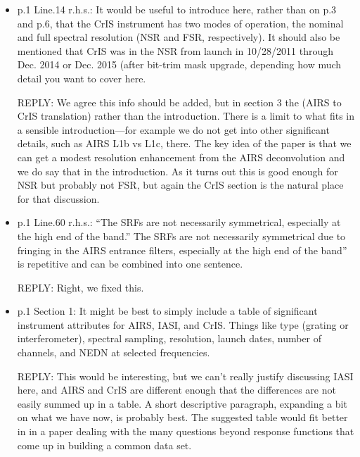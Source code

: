 \documentclass[11pt]{article}
\newcommand {\reply} {\mbox{\small REPLY}}
\begin{document}
\begin{itemize}

\item p.1 Line.14 r.h.s.: It would be useful to introduce here,
  rather than on p.3 and p.6, that the CrIS instrument has two modes
  of operation, the nominal and full spectral resolution (NSR and
  FSR, respectively).  It should also be mentioned that CrIS was in
  the NSR from launch in 10/28/2011 through Dec. 2014 or Dec. 2015
  (after bit-trim mask upgrade, depending how much detail you want
  to cover here.

  \reply: We agree this info should be added, but in section 3 the
  (AIRS to CrIS translation) rather than the introduction.  There is
  a limit to what fits in a sensible introduction---for example we
  do not get into other significant details, such as AIRS L1b vs
  L1c, there.  The key idea of the paper is that we can get a modest
  resolution enhancement from the AIRS deconvolution and we do say
  that in the introduction.  As it turns out this is good enough for
  NSR but probably not FSR, but again the CrIS section is the
  natural place for that discussion.
  

\item p.1 Line.60 r.h.s.: ``The SRFs are not necessarily
  symmetrical, especially at the high end of the band.''  The SRFs
  are not necessarily symmetrical due to fringing in the AIRS
  entrance filters, especially at the high end of the band” is
  repetitive and can be combined into one sentence.

  \reply: Right, we fixed this.

\item p.1 Section 1: It might be best to simply include a table of
  significant instrument attributes for AIRS, IASI, and CrIS. Things
  like type (grating or interferometer), spectral sampling,
  resolution, launch dates, number of channels, and NEDN at selected
  frequencies.

  \reply: This would be interesting, but we can't really justify
  discussing IASI here, and AIRS and CrIS are different enough that
  the differences are not easily summed up in a table.  A short
  descriptive paragraph, expanding a bit on what we have now, is
  probably best.  The suggested table would fit better in in a paper
  dealing with the many questions beyond response functions that
  come up in building a common data set.


\end{itemize}
\end{document}
